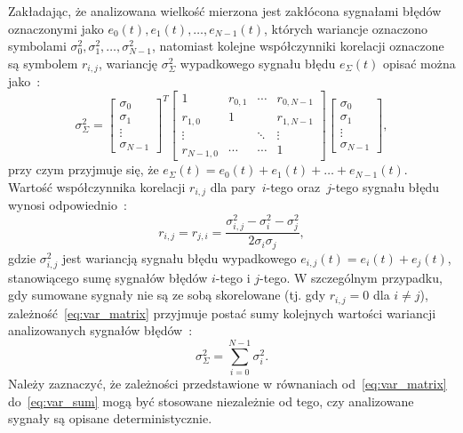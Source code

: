 Zakładając, że analizowana wielkość mierzona jest zakłócona sygnałami błędów oznaczonymi jako $e_{0}(t), e_{1}(t), \hdots, e_{N-1}(t)$, których wariancje oznaczono symbolami $\sigma_{0}^{2}, \sigma_{1}^{2}, \hdots, \sigma_{N-1}^{2}$, natomiast kolejne współczynniki korelacji oznaczone są symbolem $r_{i,j}$, wariancję $\sigma_{\Sigma}^{2}$ wypadkowego sygnału błędu $e_{\Sigma}(t)$ opisać można jako~\cite{jcgm_guide}:
\begin{equation}
\sigma_{\Sigma}^{2} =
\begin{bmatrix}
\sigma_{0} \\ \sigma_{1} \\ \vdots \\ \sigma_{N-1}
\end{bmatrix}^{T}
\begin{bmatrix}
1         & r_{0,1} & \cdots & r_{0,N-1} \\
r_{1,0}   & 1       &        & r_{1,N-1} \\
\vdots    &         & \ddots & \vdots    \\
r_{N-1,0} & \cdots  & \cdots & 1
\end{bmatrix}
\begin{bmatrix}
\sigma_{0} \\ \sigma_{1} \\ \vdots \\ \sigma_{N-1}
\end{bmatrix}
\label{eq:var_matrix},
\end{equation}
przy czym przyjmuje się, że $e_{\Sigma}(t) = e_{0}(t) + e_{1}(t) + \hdots + e_{N-1}(t)$. Wartość współczynnika korelacji $r_{i,j}$ dla pary~$i$-tego oraz~$j$-tego sygnału błędu wynosi odpowiednio~\cite{jcgm_guide}:
\begin{equation}
r_{i,j} = r_{j,i} = \frac{\sigma_{i,j}^{2} - \sigma_{i}^{2} - \sigma_{j}^{2}}{2 \sigma_{i} \sigma_{j}} \label{eq:var_corr},
\end{equation}
gdzie $\sigma_{i,j}^{2}$ jest wariancją sygnału błędu wypadkowego $e_{i,j}(t) = e_{i}(t) + e_{j}(t)$, stanowiącego sumę sygnałów błędów $i$-tego i $j$-tego. W szczególnym przypadku, gdy sumowane sygnały nie są ze sobą skorelowane (tj. gdy $r_{i,j} = 0$ dla $i \ne j$), zależność~\eqref{eq:var_matrix} przyjmuje postać sumy kolejnych wartości wariancji analizowanych sygnałów błędów~\cite{jcgm_guide}:
\begin{equation}
\sigma_{\Sigma}^{2} = \sum _{i = 0} ^{N-1} \sigma_{i}^{2} \label{eq:var_sum}.
\end{equation}
Należy zaznaczyć, że zależności przedstawione w równaniach od~\eqref{eq:var_matrix} do~\eqref{eq:var_sum} mogą być stosowane niezależnie od tego, czy analizowane sygnały są opisane deterministycznie.

